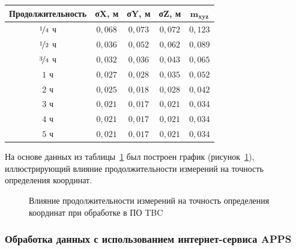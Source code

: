 \begin{table} [htbp]
	\centering\small
	\label{tab:tab16}{%
			\begin{tabular}{|c|c|c|c|c|}
				\hline
				\textbf{Продолжительность} & \textbf{σX, м}   & \textbf{σY, м} & \textbf{σZ, м} & $\mathbf{m_{xyz}}$ \\ \hline
				$\nicefrac{1}{4}$ ч        & $0,068$          & $0,073$        & $0,072$        & $0,123$            \\ \hline
				$\nicefrac{1}{2}$ ч        & $0,036$          & $0,052$        & $0,062$        & $0,089$            \\ \hline
				$\nicefrac{3}{4}$ ч        & $0,032$          & $0,036$        & $0,043$        & $0,065$            \\ \hline
				$1$ ч                      & $0,027$          & $0,028$        & $0,035$        & $0,052$            \\ \hline
				$2$ ч                      & $0,025$          & $0,018$        & $0,028$        & $0,042$            \\ \hline
				$3$ ч                      & $0,021$          & $0,017$        & $0,021$        & $0,034$            \\ \hline
				$4$ ч	                   & $0,021$          & $0,017$        & $0,021$        & $0,034$            \\ \hline
				$5$ ч                      & $0,021$          & $0,017$        & $0,021$        & $0,034$            \\ \hline
			\end{tabular}
		}
	\end{table}

На основе данных из таблицы~\cref{tab:tab16} был построен график (рисунок~\cref{fig:pic11}), иллюстрирующий влияние продолжительности измерений на точность определения координат.

\begin{figure}[h]
	\centerfloat{
		
	}
	\caption{Влияние продолжительности измерений на точность определения координат при обработке в ПО TBC}\label{fig:pic11}
\end{figure}


\subsubsection{Обработка данных с использованием интернет-сервиса APPS }\label{subsec:ch2/sec3/sub2/sub3}

